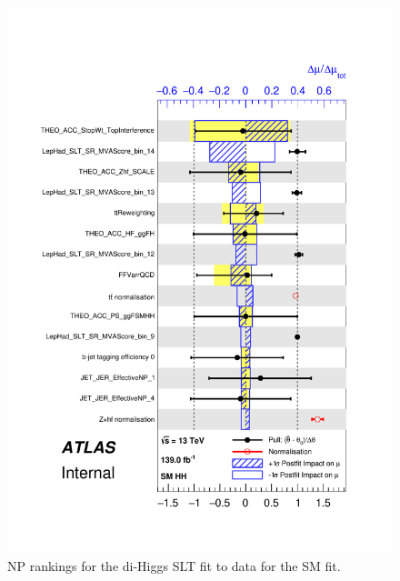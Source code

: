 \begin{figure}
\centering
\includegraphics[width=.8\textwidth]{figures/results/HH/LepHad/pulls_SigXsecOverSM_125_SLT.pdf}
\caption{NP rankings for the di-Higgs \lephad SLT fit to data for the SM fit.}
\label{fig:LepHadPostfitNPRankingsSMSLT}
\end{figure}

